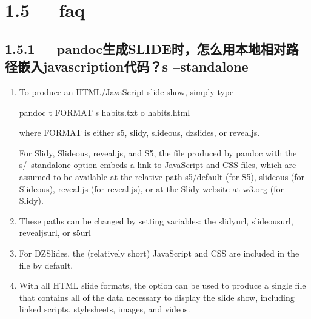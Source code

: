 \documentclass[letterpaper,12pt,english]{sphinxmanual}
\begin{document}
\section{1.5   faq}
\label{\detokenize{001software/001install/pandoc:faq}}

\subsection{1.5.1   pandoc生成SLIDE时，怎么用本地相对路径嵌入javascription代码？\sphinxhyphen{}s –stand\sphinxhyphen{}alone}
\label{\detokenize{001software/001install/pandoc:pandocslide-javascription-s-stand-alone}}\begin{enumerate}
%
\item {} 
To produce an HTML/JavaScript slide show, simply type

pandoc \sphinxhyphen{}t FORMAT \sphinxhyphen{}s habits.txt \sphinxhyphen{}o habits.html

where FORMAT is either s5, slidy, slideous, dzslides, or revealjs.

For Slidy, Slideous, reveal.js, and S5, the file produced by pandoc
with the \sphinxhyphen{}s/–standalone option embeds a link to JavaScript and CSS
files, which are assumed to be available at the relative path
s5/default (for S5), slideous (for Slideous), reveal.js (for
reveal.js), or at the Slidy website at w3.org (for Slidy).

\item {} 
These paths can be changed by setting variables: the slidy\sphinxhyphen{}url,
slideous\sphinxhyphen{}url, revealjs\sphinxhyphen{}url, or s5\sphinxhyphen{}url

\begin{sphinxVerbatim}[commandchars=\\\{\}]
 
     
\end{sphinxVerbatim}

\item {} 
For DZSlides, the (relatively short) JavaScript and CSS are included
in the file by default.

\item {} 
With all HTML slide formats, the  option can be
used to produce a single file that contains all of the data necessary
to display the slide show, including linked scripts, stylesheets,
images, and videos.

\end{enumerate}
\end{document}
